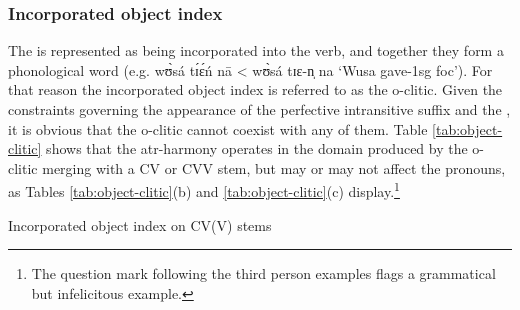 \begin{exe}
\begin{exe}
\begin{exe}
\begin{exe}
\begin{exe}
\begin{exe}
\begin{exe}
\begin{exe}
\begin{exe}
\begin{exe}
\begin{exe}
\begin{exe}
\subsubsection{Incorporated object index}
\label{sec:GRM-morph-opro}


The   is represented as being incorporated into the verb,  and together they form a phonological word (e.g.  {\sls wʊ̀sá tɪ́ɛ́ń nā} < {\sls wʊ̀sá tɪɛ-n̩ na}  `Wusa gave-{\sc 1sg} {\sc foc}').  For that reason the incorporated object index is referred to as the {\sc o}-clitic. Given the constraints governing the appearance of the perfective intransitive suffix and the , it is obvious that the {\sc o}-clitic cannot coexist with any of them.  Table \ref{tab:object-clitic} shows that the {\sc atr}-harmony operates in the domain produced by the {\sc o}-clitic merging with a CV or CVV stem, but may or may not affect the  pronouns, as Tables \ref{tab:object-clitic}(b) and \ref{tab:object-clitic}(c) display.\footnote{The question mark following the third person   examples flags a grammatical but infelicitous example.}

\begin{table}[!htb]
\centering
\caption{Incorporated object index on  CV(V) stems\label{tab:object-clitic}}


\end{table}
\end{exe}
\end{exe}
\end{exe}
\end{exe}
\end{exe}
\end{exe}
\end{exe}
\end{exe}
\end{exe}
\end{exe}
\end{exe}
\end{exe}
